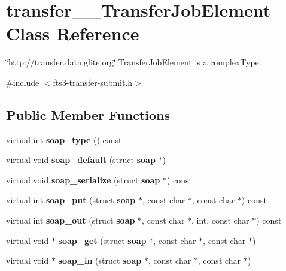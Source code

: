 \section{transfer\_\-\_\-TransferJobElement Class Reference}
\label{classtransfer____TransferJobElement}


\char`\"{}http://transfer.data.glite.org\char`\"{}:TransferJobElement is a complexType.  




{\ttfamily \#include $<$fts3-\/transfer-\/submit.h$>$}

\subsection*{Public Member Functions}
\begin{DoxyCompactItemize}
\item 
virtual int {\bfseries soap\_\-type} () const \label{classtransfer____TransferJobElement_aabd7d06ef5e049122f207607d1815048}

\item 
virtual void {\bfseries soap\_\-default} (struct {\bf soap} $\ast$)\label{classtransfer____TransferJobElement_acca82e2a7d135705dbd2f2599bfa4a6d}

\item 
virtual void {\bfseries soap\_\-serialize} (struct {\bf soap} $\ast$) const \label{classtransfer____TransferJobElement_ac64c93da6a0bc5c8b194208d1911cdd0}

\item 
virtual int {\bfseries soap\_\-put} (struct {\bf soap} $\ast$, const char $\ast$, const char $\ast$) const \label{classtransfer____TransferJobElement_ae9c11deaf7ab43f4a5f45a542b0d8f8d}

\item 
virtual int {\bfseries soap\_\-out} (struct {\bf soap} $\ast$, const char $\ast$, int, const char $\ast$) const \label{classtransfer____TransferJobElement_aea76fb30df6904dcc6142550622efed7}

\item 
virtual void $\ast$ {\bfseries soap\_\-get} (struct {\bf soap} $\ast$, const char $\ast$, const char $\ast$)\label{classtransfer____TransferJobElement_a22d2f480e751707d8a64efd768eabea4}

\item 
virtual void $\ast$ {\bfseries soap\_\-in} (struct {\bf soap} $\ast$, const char $\ast$, const char $\ast$)\label{classtransfer____TransferJobElement_a966e5798fc9acc069d5723da0b75ed4d}

\end{DoxyCompactItemize}
